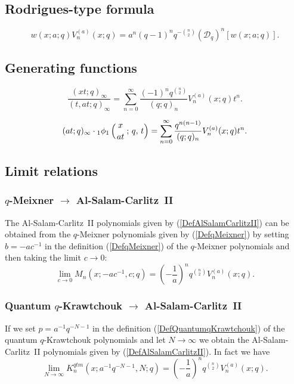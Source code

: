 \documentclass[envcountchap,graybox]{svmono}
\newcounter{rom}
\newcommand{\qhyp}[5]{\mbox{}_{#1}{\phi}_{#2}
\left(\genfrac{}{}{0pt}{}{#3}{#4}\,;\,q,\,#5\right)}
\newcommand{\qhyp}[5]{\,\mbox{}_{#1}\phi_{#2}\!\left(
  \genfrac{}{}{0pt}{}{#3}{#4};#5\right)}
\begin{document}
{{\newpage

\subsection*{Rodrigues-type formula}
\begin{equation}
\label{RodAlSalamCarlitzII}
w(x;a;q)V_n^{(a)}(x;q)=a^n(q-1)^nq^{-\binom{n}{2}}
\left(\mathcal{D}_q\right)^n\left[w(x;a;q)\right].
\end{equation}

\subsection*{Generating functions}
\begin{equation}
\label{GenAlSalmCarlitzII1}
\frac{(xt;q)_{\infty}}{(t,at;q)_{\infty}}=\sum_{n=0}^{\infty}
\frac{(-1)^nq^{\binom{n}{2}}}{(q;q)_n}V_n^{(a)}(x;q)t^n.
\end{equation}

\begin{equation}
\label{GenAlSalamCarlitzII2}
(at;q)_{\infty}\cdot\qhyp{1}{1}{x}{at}{t}=\sum_{n=0}^{\infty}
\frac{q^{n(n-1)}}{(q;q)_n}V_n^{(a)}(x;q)t^n.
\end{equation}

\subsection*{Limit relations}

\subsubsection*{$q$-Meixner $\rightarrow$ Al-Salam-Carlitz~II}
The Al-Salam-Carlitz~II polynomials given by (\ref{DefAlSalamCarlitzII})
can be obtained from the $q$-Meixner polynomials given by (\ref{DefqMeixner})
by setting $b=-ac^{-1}$ in the definition (\ref{DefqMeixner}) of the
$q$-Meixner polynomials and then taking the limit $c\rightarrow 0$:
$$\lim_{c\rightarrow 0}M_n(x;-ac^{-1},c;q)=
\left(-\frac{1}{a}\right)^nq^{\binom{n}{2}}V_n^{(a)}(x;q).$$

\subsubsection*{Quantum $q$-Krawtchouk $\rightarrow$ Al-Salam-Carlitz~II}
If we set $p=a^{-1}q^{-N-1}$ in the definition (\ref{DefQuantumqKrawtchouk})
of the quantum $q$-Krawtchouk polynomials and let $N\rightarrow\infty$ we
obtain the Al-Salam-Carlitz~II polynomials given by
(\ref{DefAlSalamCarlitzII}). In fact we have
$$\lim_{N\rightarrow\infty}K_n^{qtm}(x;a^{-1}q^{-N-1},N;q)=
\left(-\frac{1}{a}\right)^nq^{\binom{n}{2}}V_n^{(a)}(x;q).$$

}}
\end{document}
